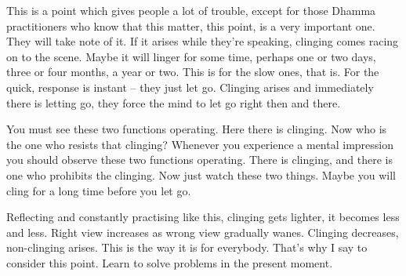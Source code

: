 This is a point which gives people a lot of trouble, except for those Dhamma practitioners who know that this matter, this point, is a very important one. They will take note of it. If it arises while they're speaking, clinging comes racing on to the scene. Maybe it will linger for some time, perhaps one or two days, three or four months, a year or two. This is for the slow ones, that is. For the quick, response is instant -- they just let go. Clinging arises and immediately there is letting go, they force the mind to let go right then and there. 

You must see these two functions operating. Here there is clinging. Now who is the one who resists that clinging? Whenever you experience a mental impression you should observe these two functions operating. There is clinging, and there is one who prohibits the clinging. Now just watch these two things. Maybe you will cling for a long time before you let go. 

Reflecting and constantly practising like this, clinging gets lighter, it becomes less and less. Right view increases as wrong view gradually wanes. Clinging decreases, non-clinging arises. This is the way it is for everybody. That's why I say to consider this point. Learn to solve problems in the present moment.

